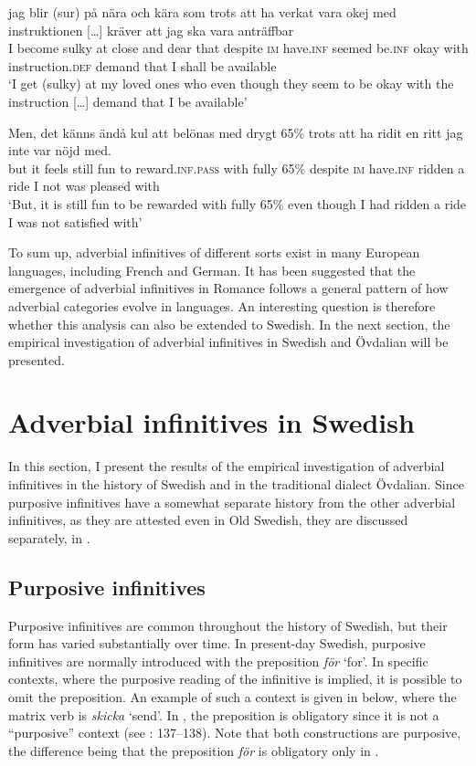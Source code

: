 \documentclass[output=paper]{langscibook}
\begin{document}
\ea
\label{ex:kalm:7}
\ea  \label{ex:kalm:7a}
\gll jag blir (sur) på nära och kära som trots att ha verkat vara okej med {instruktionen […]} kräver att jag ska vara anträffbar\\
I become sulky at close and dear that despite \textsc{im} have.\textsc{inf} seemed be.\textsc{inf} okay with instruction.\textsc{def} demand that I shall be available\\ 
\glt ‘I get (sulky) at my loved ones who even though they seem to be okay with the instruction […] demand that I be available’ \citep{Blogg2007}

\ex  \label{ex:kalm:7b}
\gll Men, det känns ändå kul att belönas med drygt 65\% trots att ha ridit en ritt jag inte var nöjd med.\\
but it feels still fun to reward.\textsc{inf.pass} with fully 65\% despite \textsc{im} have.\textsc{inf} ridden a ride I not was pleased with\\ 
\glt ‘But, it is still fun to be rewarded with fully 65\% even though I had ridden a ride I was not satisfied with’ \citep{Blogg2016}
\z 
\z 



To sum up, adverbial infinitives of different sorts exist in many European languages, including French and German. It has been suggested that the emergence of adverbial infinitives in Romance follows a general pattern of how adverbial categories evolve in languages. An interesting question is therefore whether this analysis can also be extended to Swedish. In the next section, the empirical investigation of adverbial infinitives in Swedish and Övdalian will be presented. 


\section{Adverbial infinitives in Swedish}\label{sec:kalm:4}
In this section, I present the results of the empirical investigation of adverbial infinitives in the history of Swedish and in the traditional dialect Övdalian. Since purposive infinitives have a somewhat separate history from the other adverbial infinitives, as they are attested even in Old Swedish, they are discussed separately, in .


\subsection{Purposive infinitives}\label{sec:kalm:4.1}
Purposive infinitives are common throughout the history of Swedish, but their form has varied substantially over time. In present-day Swedish, purposive infinitives are normally introduced with the preposition \textit{för} ‘for’. In specific contexts, where the purposive reading of the infinitive is implied, it is possible to omit the preposition. An example of such a context is given in  below, where the matrix verb is \textit{skicka} ‘send’. In , the preposition is obligatory since it is not a “purposive” context (see \citealt{Kalm2016Satsekvivalenta}: 137–138). Note that both constructions are purposive, the difference being that the preposition \textit{för} is obligatory only in . 
\end{document}

